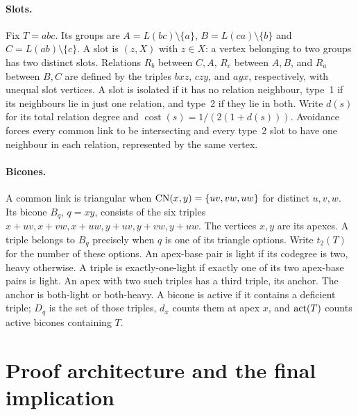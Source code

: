 \paragraph{Slots.}
Fix $T=abc$. Its groups are $A=L(bc)\setminus\{a\}$, $B=L(ca)\setminus\{b\}$ and $C=L(ab)\setminus\{c\}$. A slot is $(z,X)$ with $z\in X$: a vertex belonging to two groups has two distinct slots. Relations $R_b$ between $C,A$, $R_c$ between $A,B$, and $R_a$ between $B,C$ are defined by the triples $bxz$, $czy$, and $ayx$, respectively, with unequal slot vertices. A slot is isolated if it has no relation neighbour, type~1 if its neighbours lie in just one relation, and type~2 if they lie in both. Write $d(s)$ for its total relation degree and $\operatorname{cost}(s)=1/(2(1+d(s)))$. Avoidance forces every common link to be intersecting and every type~2 slot to have one neighbour in each relation, represented by the same vertex.

\paragraph{Bicones.}
A common link is triangular when $\operatorname{CN}(x,y)=\{uv,vw,uw\}$ for distinct $u,v,w$. Its bicone $B_q$, $q=xy$, consists of the six triples $x+uv,x+vw,x+uw,y+uv,y+vw,y+uw$. The vertices $x,y$ are its apexes. A triple belongs to $B_q$ precisely when $q$ is one of its triangle options. Write $t_2(T)$ for the number of these options.
An apex-base pair is light if its codegree is two, heavy otherwise. A triple is exactly-one-light if exactly one of its two apex-base pairs is light. An apex with two such triples has a third triple, its anchor. The anchor is both-light or both-heavy. A bicone is active if it contains a deficient triple; $D_q$ is the set of those triples, $d_x$ counts them at apex $x$, and $\operatorname{act}(T)$ counts active bicones containing $T$.

\section{Proof architecture and the final implication}
